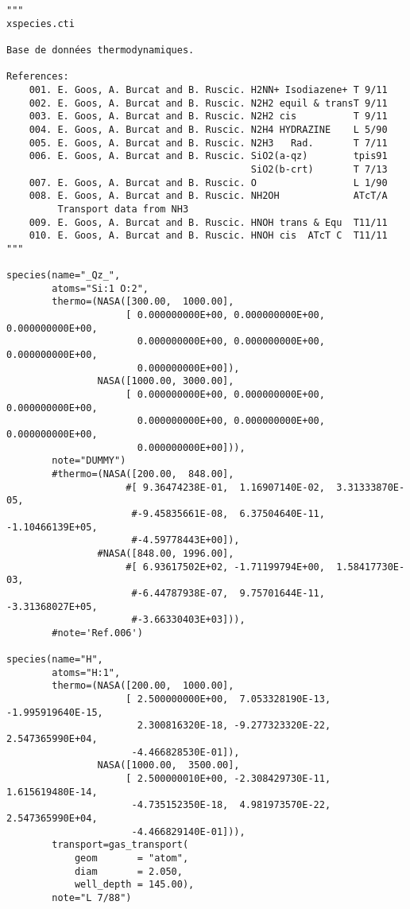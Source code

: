 \begin{verbatim}
"""
xspecies.cti

Base de données thermodynamiques.

References:
    001. E. Goos, A. Burcat and B. Ruscic. H2NN+ Isodiazene+ T 9/11
    002. E. Goos, A. Burcat and B. Ruscic. N2H2 equil & transT 9/11
    003. E. Goos, A. Burcat and B. Ruscic. N2H2 cis          T 9/11
    004. E. Goos, A. Burcat and B. Ruscic. N2H4 HYDRAZINE    L 5/90
    005. E. Goos, A. Burcat and B. Ruscic. N2H3   Rad.       T 7/11
    006. E. Goos, A. Burcat and B. Ruscic. SiO2(a-qz)        tpis91
                                           SiO2(b-crt)       T 7/13
    007. E. Goos, A. Burcat and B. Ruscic. O                 L 1/90
    008. E. Goos, A. Burcat and B. Ruscic. NH2OH             ATcT/A
         Transport data from NH3
    009. E. Goos, A. Burcat and B. Ruscic. HNOH trans & Equ  T11/11
    010. E. Goos, A. Burcat and B. Ruscic. HNOH cis  ATcT C  T11/11
"""

species(name="_Qz_",
        atoms="Si:1 O:2",
        thermo=(NASA([300.00,  1000.00],
                     [ 0.000000000E+00, 0.000000000E+00, 0.000000000E+00,
                       0.000000000E+00, 0.000000000E+00, 0.000000000E+00,
                       0.000000000E+00]),
                NASA([1000.00, 3000.00],
                     [ 0.000000000E+00, 0.000000000E+00, 0.000000000E+00,
                       0.000000000E+00, 0.000000000E+00, 0.000000000E+00,
                       0.000000000E+00])),
        note="DUMMY")
        #thermo=(NASA([200.00,  848.00],
                     #[ 9.36474238E-01,  1.16907140E-02,  3.31333870E-05,
                      #-9.45835661E-08,  6.37504640E-11, -1.10466139E+05,
                      #-4.59778443E+00]),
                #NASA([848.00, 1996.00],
                     #[ 6.93617502E+02, -1.71199794E+00,  1.58417730E-03,
                      #-6.44787938E-07,  9.75701644E-11, -3.31368027E+05,
                      #-3.66330403E+03])),
        #note='Ref.006')

species(name="H",
        atoms="H:1",
        thermo=(NASA([200.00,  1000.00],
                     [ 2.500000000E+00,  7.053328190E-13, -1.995919640E-15,
                       2.300816320E-18, -9.277323320E-22,  2.547365990E+04,
                      -4.466828530E-01]),
                NASA([1000.00,  3500.00],
                     [ 2.500000010E+00, -2.308429730E-11,  1.615619480E-14,
                      -4.735152350E-18,  4.981973570E-22,  2.547365990E+04,
                      -4.466829140E-01])),
        transport=gas_transport(
            geom       = "atom",
            diam       = 2.050,
            well_depth = 145.00),
        note="L 7/88")


\end{verbatim}
